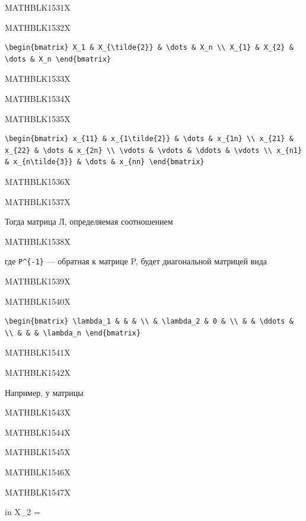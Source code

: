 \documentclass[
  ukrainian,
]{article}
\begin{document}
MATHBLK1531X

MATHBLK1532X

\begin{verbatim}
\begin{bmatrix} X_1 & X_{\tilde{2}} & \dots & X_n \\ X_{1} & X_{2} & \dots & X_n \end{bmatrix}
\end{verbatim}

MATHBLK1533X

MATHBLK1534X

MATHBLK1535X

\begin{verbatim}
\begin{bmatrix} x_{11} & x_{1\tilde{2}} & \dots & x_{1n} \\ x_{21} & x_{22} & \dots & x_{2n} \\ \vdots & \vdots & \ddots & \vdots \\ x_{n1} & x_{n\tilde{3}} & \dots & x_{nn} \end{bmatrix}
\end{verbatim}

MATHBLK1536X

MATHBLK1537X

Тогда матрица Л, определяемая соотношением

MATHBLK1538X

где \texttt{P\^{}\{-1\}} --- обратная к матрице P, будет диагональной
матрицей вида

MATHBLK1539X

MATHBLK1540X

\begin{verbatim}
\begin{bmatrix} \lambda_1 & & & \\ & \lambda_2 & 0 & \\ & & \ddots & \\ & & & \lambda_n \end{bmatrix}
\end{verbatim}

MATHBLK1541X

MATHBLK1542X

Например, у матрицы

MATHBLK1543X

MATHBLK1544X

MATHBLK1545X

MATHBLK1546X

MATHBLK1547X

in X\_2 =
\end{document}
